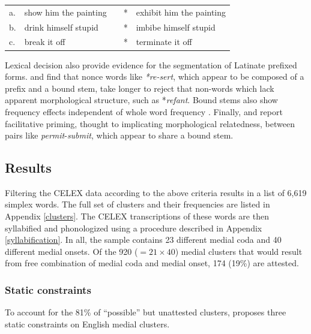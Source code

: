 \begin{example}
\label{harley}
\begin{tabular}{l l l l@{} l}
a. & {show him the painting} & \alt{} & * & {exhibit him the painting} \\
b. & {drink himself stupid}  & \alt{} & * & {imbibe himself stupid}    \\
c. & {break it off}          & \alt{} & * & {terminate it off}         \\
\end{tabular}
\end{example}

Lexical decision also provide evidence for the segmentation of Latinate prefixed forms.
\citet{Taft1975,Taft1976} and \citet{Taft1986} find that nonce words like \emph{*re-sert}, which appear to be composed of a prefix and a bound stem, take longer to reject that non-words which lack apparent morphological structure, such as *\emph{refant}. 
Bound stems also show frequency effects independent of whole word frequency \citep{Taft1979,Taft2006}.
Finally, \citet{Emmorey1989} and \citet{Forster2000} report facilitative priming, thought to implicating morphological relatedness, between pairs like \emph{permit}-\emph{submit}, which appear to share a bound stem.

\subsection{Results}

Filtering the CELEX data according to the above criteria results in a list of 6,619 simplex words.
The full set of clusters and their frequencies are listed in Appendix \ref{clusters}.
The CELEX transcriptions of these words are then syllabified and phonologized using a procedure
described in Appendix \ref{syllabification}. 
In all, the sample contains 23 different medial coda and 40 different medial onsets.
Of the 920 ($= 21 \times 40$) medial clusters that would result from free combination of medial coda and medial onset, 174 (19\%) are attested.

\subsubsection{Static constraints}

To account for the 81\% of ``possible'' but unattested clusters, \citet{Pierrehumbert1994} proposes three static constraints on English medial clusters.

